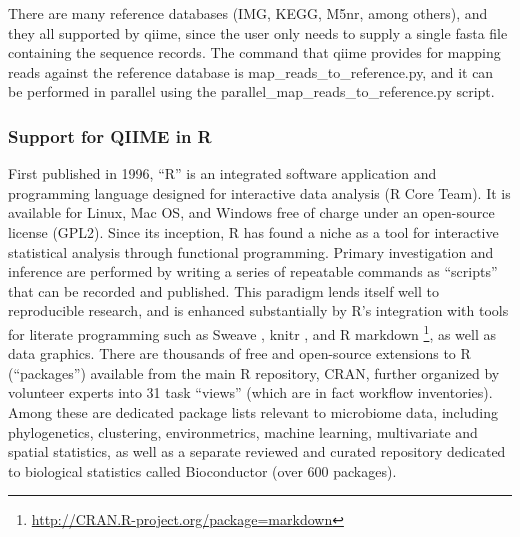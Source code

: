 There are many reference databases (IMG, KEGG, M5nr, among others), and they all
supported by \gls{qiime}, since the user only needs to supply a single fasta file containing
the sequence records. The command that \gls{qiime} provides for mapping reads against the
reference database is map\_reads\_to\_reference.py, and it can be performed in parallel
using the parallel\_map\_reads\_to\_reference.py script.

\subsubsection{Support for QIIME in R}

First published in 1996, “R” is an integrated software application and programming
language designed for interactive data analysis (R Core Team). It is available for Linux,
Mac OS, and Windows free of charge under an open-source license (GPL2). Since its inception,
R has found a niche as a tool for interactive statistical analysis through functional programming.
Primary investigation and inference are performed by writing a series of repeatable commands as
“scripts” that can be recorded and published. This paradigm lends itself well to reproducible
research, and is enhanced substantially by R's integration with tools for literate programming
such as Sweave \cite{FriedrichLeisch2002}, knitr \cite{Xie2013}, and R markdown
\footnote{\url{http://CRAN.R-project.org/package=markdown}}, as well as data graphics. There are thousands
of free and open-source extensions to R (“packages”) available from the main R repository, CRAN,
further organized by volunteer experts into 31 task “views” (which are in fact workflow inventories).
Among these are dedicated package lists relevant to microbiome data, including phylogenetics, clustering,
environmetrics, machine learning, multivariate and spatial statistics, as well as a separate reviewed and
curated repository dedicated to biological statistics called Bioconductor (over 600 packages).

